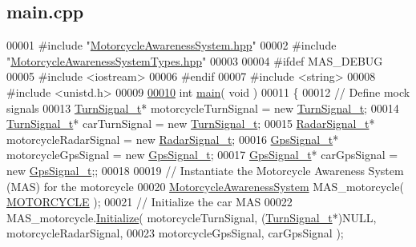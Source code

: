 \hypertarget{main_8cpp_source}{\subsection{main.\-cpp}
}

\begin{DoxyCode}
00001 \textcolor{preprocessor}{#include "\hyperlink{MotorcycleAwarenessSystem_8hpp}{MotorcycleAwarenessSystem.hpp}"}
00002 \textcolor{preprocessor}{#include "\hyperlink{MotorcycleAwarenessSystemTypes_8hpp}{MotorcycleAwarenessSystemTypes.hpp}"}
00003 
00004 \textcolor{preprocessor}{#ifdef MAS\_DEBUG}
00005 \textcolor{preprocessor}{}\textcolor{preprocessor}{#include <iostream>}
00006 \textcolor{preprocessor}{#endif}
00007 \textcolor{preprocessor}{}\textcolor{preprocessor}{#include <string>}
00008 \textcolor{preprocessor}{#include <unistd.h>}
00009 
\hypertarget{main_8cpp_source_l00010}{}\hyperlink{main_8cpp_a840291bc02cba5474a4cb46a9b9566fe}{00010} \textcolor{keywordtype}{int} \hyperlink{main_8cpp_a840291bc02cba5474a4cb46a9b9566fe}{main}( \textcolor{keywordtype}{void} )
00011 \{
00012     \textcolor{comment}{// Define mock signals}
00013     \hyperlink{structTurnSignal__t}{TurnSignal\_t}* motorcycleTurnSignal = \textcolor{keyword}{new} \hyperlink{structTurnSignal__t}{TurnSignal\_t};
00014     \hyperlink{structTurnSignal__t}{TurnSignal\_t}* carTurnSignal = \textcolor{keyword}{new} \hyperlink{structTurnSignal__t}{TurnSignal\_t};
00015     \hyperlink{structRadarSignal__t}{RadarSignal\_t}* motorcycleRadarSignal = \textcolor{keyword}{new} \hyperlink{structRadarSignal__t}{RadarSignal\_t};
00016     \hyperlink{structGpsSignal__t}{GpsSignal\_t}* motorcycleGpsSignal = \textcolor{keyword}{new} \hyperlink{structGpsSignal__t}{GpsSignal\_t};
00017     \hyperlink{structGpsSignal__t}{GpsSignal\_t}* carGpsSignal = \textcolor{keyword}{new} \hyperlink{structGpsSignal__t}{GpsSignal\_t};;
00018 
00019     \textcolor{comment}{// Instantiate the Motorcycle Awareness System (MAS) for the motorcycle}
00020     \hyperlink{classMotorcycleAwarenessSystem}{MotorcycleAwarenessSystem} MAS\_motorcycle( 
      \hyperlink{MotorcycleAwarenessSystemTypes_8hpp_a0c05c42b98a847f971385c81c2a81afaa39b983b1f7acfc4e7c900d77b0fded6a}{MOTORCYCLE} );
00021     \textcolor{comment}{// Initialize the car MAS}
00022     MAS\_motorcycle.\hyperlink{classMotorcycleAwarenessSystem_a826b6c2286c494c8aca3a47e6430b3ff}{Initialize}( motorcycleTurnSignal, (\hyperlink{structTurnSignal__t}{TurnSignal\_t}*)NULL, 
      motorcycleRadarSignal,
00023                                           motorcycleGpsSignal, carGpsSignal );

\end{DoxyCode}
